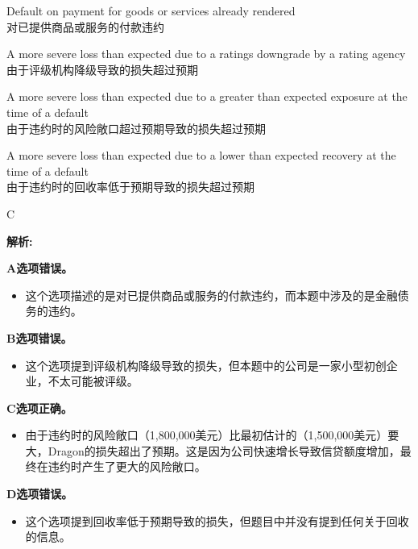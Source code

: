 \documentclass{article}
\newenvironment{explanation}
{\textbf{解析:}\par}
{\par}
\begin{document}
\begin{choices}
    \item Default on payment for goods or services already rendered\\
    对已提供商品或服务的付款违约
    \item A more severe loss than expected due to a ratings downgrade by a rating agency\\
    由于评级机构降级导致的损失超过预期
    \item A more severe loss than expected due to a greater than expected exposure at the time of a default\\
    由于违约时的风险敞口超过预期导致的损失超过预期
    \item A more severe loss than expected due to a lower than expected recovery at the time of a default\\
    由于违约时的回收率低于预期导致的损失超过预期
\end{choices}

\begin{correctanswer}
    C
\end{correctanswer}

\begin{explanation}
    \textbf{A选项错误。}
    \begin{itemize}
        \item 这个选项描述的是对已提供商品或服务的付款违约，而本题中涉及的是金融债务的违约。
    \end{itemize}
    
    \textbf{B选项错误。}
    \begin{itemize}
        \item 这个选项提到评级机构降级导致的损失，但本题中的公司是一家小型初创企业，不太可能被评级。
    \end{itemize}
    
    \textbf{C选项正确。}
    \begin{itemize}
        \item 由于违约时的风险敞口（1,800,000美元）比最初估计的（1,500,000美元）要大，Dragon的损失超出了预期。这是因为公司快速增长导致信贷额度增加，最终在违约时产生了更大的风险敞口。
    \end{itemize}
    
    \textbf{D选项错误。}
    \begin{itemize}
        \item 这个选项提到回收率低于预期导致的损失，但题目中并没有提到任何关于回收的信息。
    \end{itemize}
\end{explanation}
\end{document}
